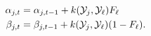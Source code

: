 \vspace{-2ex}
\begin{align}
	\alpha_{j,t} &= \alpha_{j,t-1} + k(\mathcal{Y}_{j}, \mathcal{Y}_{\ell}) F_{\ell} \label{eq:alpha} \\
	\beta_{j,t} &= \beta_{j,t-1} + k(\mathcal{Y}_{j}, \mathcal{Y}_{\ell}) (1 - F_{\ell})\label{eq:beta}.
\end{align}


%

